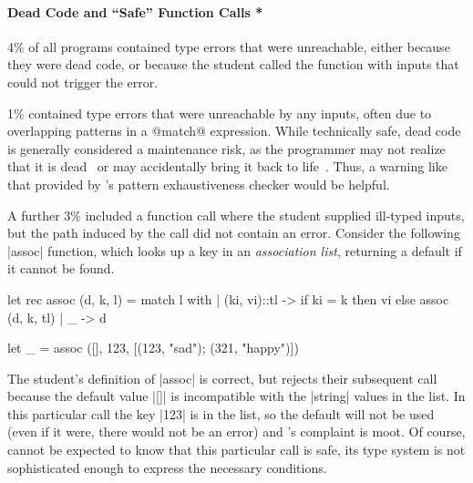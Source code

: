 \paragraph{Dead Code and ``Safe'' Function Calls *}
%
4\% of all programs contained type errors that were unreachable, either
because they were dead code, or because the student called the function
with inputs that could not trigger the error.


1\% contained type errors that were unreachable by any inputs, often due
to overlapping patterns in a @match@ expression.
%
%
While technically safe, dead code is generally considered a maintenance
risk, as the programmer may not realize that it is dead~\cite{Wheeler2014-fg}
or may accidentally bring it back to life~\cite{Seven2014-gf}.
%
Thus, a warning like that provided by \ocaml's pattern exhaustiveness
checker would be helpful.

A further 3\% included a function call where the
student supplied ill-typed inputs, but the path induced
by the call did not contain an error.
%
Consider the following |assoc| function, which
looks up a key in an \emph{association list}, returning a default if
it cannot be found.
%
\begin{code}
  let rec assoc (d, k, l) = match l with
    | (ki, vi)::tl ->
       if ki = k then
         vi
       else
         assoc (d, k, tl)
    | _ -> d

  let _ = assoc ([], 123, [(123, "sad"); (321, "happy")])
\end{code}
%
The student's definition of |assoc| is correct, but \ocaml rejects their
subsequent call because the default value |[]| is incompatible with the
|string| values in the list.
%
In this particular call the key |123| is in the list, so the default
will not be used (even if it were, there would not be an error) and
\ocaml's complaint is moot.
%
Of course, \ocaml cannot be expected to know that this particular call
is safe, its type system is not sophisticated enough to express the
necessary conditions.
%

